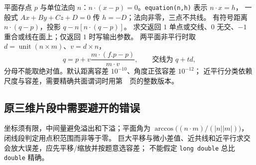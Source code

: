 平面存点 $p$ 与单位法向 $n$：$n\cdot(x-p)=0$。\texttt{equation(n,h)} 表示 $n\cdot x=h$，
一般式 $Ax+By+Cz+D=0$ 传 $h=-D$；法向非零，三点不共线。
有符号距离 $n\cdot(q-p)$，投影 $q-n[n\cdot(q-p)]$。
求交返回 $1$ 单点或交线、$0$ 无交、$-1$ 重合或线在面上；仅返回 $1$ 时写输出参数。
两平面非平行时取 $d=\operatorname{unit}(n\times m)$、$v=d\times n$，
\[
q=p+v\frac{m\cdot(f.p-p)}{m\cdot v},\qquad\text{交线为 }q+td,
\]
分母不能取绝对值。默认距离容差 $10^{-10}$、角度正弦容差 $10^{-12}$；
近平行分类依赖尺度与容差，需要精确共面谓词时用第~\pageref{compact-IntegerGeometry3D}~页的整数版本。

\subsection{原三维片段中需要避开的错误}
坐标须有限，中间量避免溢出和下溢；平面角为 $\arccos\bigl((n\cdot m)/(|n||m|)\bigr)$，闭线段判定用点积范围而非等于零。
巨大平移与微小差值、近共线和近平行求交会放大误差，应先平移/缩放并按题意选容差；
不能假定 \texttt{long double} 总比 \texttt{double} 精确。
